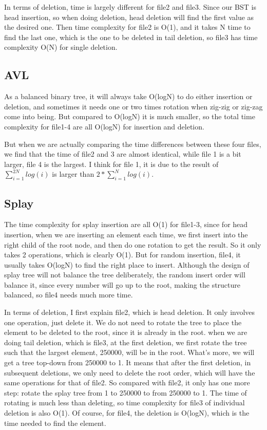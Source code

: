 \documentclass[]{article}
\begin{document}
In terms of deletion, time is largely different for file2 and file3.
Since our BST is head insertion, so when doing deletion, head deletion
will find the first value as the desired one. Then time complexity for
file2 is O(1), and it takes N time to find the last one, which is the
one to be deleted in tail deletion, so file3 has time complexity O(N)
for single deletion.

\subsection{AVL}\label{avl}

As a balanced binary tree, it will always take O(logN) to do either
insertion or deletion, and sometimes it needs one or two times rotation
when zig-zig or zig-zag come into being. But compared to O(logN) it is
much smaller, so the total time complexity for file1-4 are all O(logN)
for insertion and deletion.

But when we are actually comparing the time differences between these
four files, we find that the time of file2 and 3 are almost identical,
while file 1 is a bit larger, file 4 is the largest. I think for file 1,
it is due to the result of \(\sum^{2N}_{i=1}log(i)\) is larger than
\(2*\sum^{N}_{i=1}log(i)\).

\subsection{Splay}\label{splay}

The time complexity for splay insertion are all O(1) for file1-3, since
for head insertion, when we are inserting an element each time, we first
insert into the right child of the root node, and then do one rotation
to get the result. So it only takes 2 operations, which is clearly O(1).
But for random insertion, file4, it usually takes O(logN) to find the
right place to insert. Although the design of splay tree will not
balance the tree deliberately, the random insert order will balance it,
since every number will go up to the root, making the structure
balanced, so file4 needs much more time.

In terms of deletion, I first explain file2, which is head deletion. It
only involves one operation, just delete it. We do not need to rotate
the tree to place the element to be deleted to the root, since it is
already in the root. when we are doing tail deletion, which is file3, at
the first deletion, we first rotate the tree such that the largest
element, 250000, will be in the root. What's more, we will get a tree
top-down from 250000 to 1. It means that after the first deletion, in
subsequent deletions, we only need to delete the root order, which will
have the same operations for that of file2. So compared with file2, it
only has one more step: rotate the splay tree from 1 to 250000 to from
250000 to 1. The time of rotating is much less than deleting, so time
complexity for file3 of individual deletion is also O(1). Of course, for
file4, the deletion is O(logN), which is the time needed to find the
element.
\end{document}
